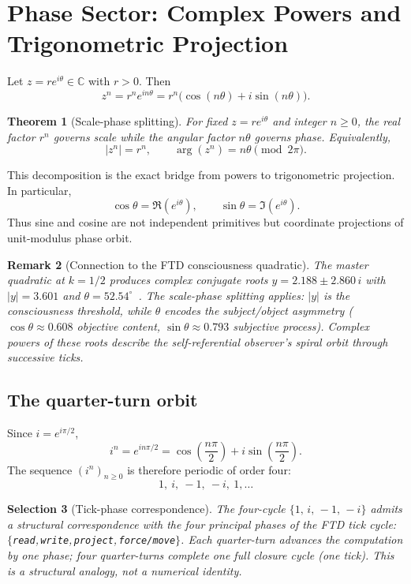 \documentclass[11pt]{article}
\theoremstyle{tight}
\newtheorem{theorem}{Theorem}[section]
\theoremstyle{plainroman}
\newtheorem{selection}[theorem]{Selection}
\newtheorem{remark}[theorem]{Remark}
\newcommand{\C}{\mathbb{C}}
\begin{document}
\section{Phase Sector: Complex Powers and Trigonometric Projection}

Let $z=re^{i\theta}\in\C$ with $r>0$. Then
\[
z^n=r^n e^{in\theta}=r^n\bigl(\cos(n\theta)+i\sin(n\theta)\bigr).
\]
\begin{theorem}[Scale-phase splitting]
For fixed $z=re^{i\theta}$ and integer $n\ge 0$, the real factor $r^n$ governs scale while the angular factor $n\theta$ governs phase.
Equivalently,
\[
|z^n|=r^n, \qquad \arg(z^n)=n\theta \pmod{2\pi}.
\]
\end{theorem}
This decomposition is the exact bridge from powers to trigonometric projection. In particular,
\[
\cos\theta=\Re(e^{i\theta}), \qquad \sin\theta=\Im(e^{i\theta}).
\]
Thus sine and cosine are not independent primitives but coordinate projections of unit-modulus phase orbit.

\begin{remark}[Connection to the FTD consciousness quadratic]
The master quadratic at $k=1/2$ produces complex conjugate roots $y=2.188\pm 2.860\,i$ with $|y|=3.601$ and $\theta=52.54^\circ$~\cite{ftdcons}.
The scale-phase splitting applies: $|y|$ is the consciousness threshold, while $\theta$ encodes the subject/object asymmetry ($\cos\theta\approx 0.608$ objective content, $\sin\theta\approx 0.793$ subjective process).
Complex powers of these roots describe the self-referential observer's spiral orbit through successive ticks.
\end{remark}

\subsection{The quarter-turn orbit}
Since $i=e^{i\pi/2}$,
\[
i^n=e^{in\pi/2}=\cos\left(\frac{n\pi}{2}\right)+i\sin\left(\frac{n\pi}{2}\right).
\]
The sequence $(i^n)_{n\ge 0}$ is therefore periodic of order four:
\[
1,\ i,\ -1,\ -i,\ 1,\dots
\]

\begin{selection}[Tick-phase correspondence]
The four-cycle $\{1,\,i,\,-1,\,-i\}$ admits a structural correspondence with the four principal phases of the FTD tick cycle: $\{$\texttt{read},\,\texttt{write},\,\texttt{project},\,\texttt{force/move}$\}$.
Each quarter-turn advances the computation by one phase; four quarter-turns complete one full closure cycle (one tick).
This is a structural analogy, not a numerical identity.
\end{selection}
\end{document}
